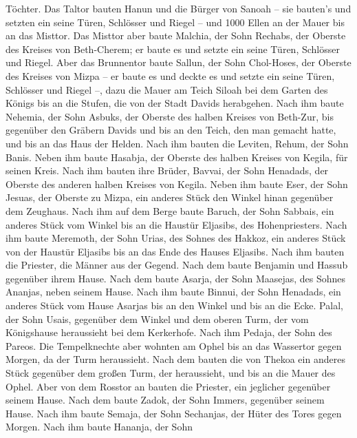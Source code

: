 Töchter.  Das Taltor bauten Hanun und die Bürger von Sanoah
-- sie bauten's und setzten ein seine Türen, Schlösser und Riegel -- und
1000 Ellen an der Mauer bis an das Misttor.  Das Misttor
aber baute Malchia, der Sohn Rechabs, der Oberste des Kreises von
Beth-Cherem; er baute es und setzte ein seine Türen, Schlösser und
Riegel.  Aber das Brunnentor baute Sallun, der Sohn
Chol-Hoses, der Oberste des Kreises von Mizpa -- er baute es und deckte
es und setzte ein seine Türen, Schlösser und Riegel --, dazu die Mauer
am Teich Siloah bei dem Garten des Königs bis an die Stufen, die von der
Stadt Davids herabgehen.  Nach ihm baute Nehemia, der Sohn
Asbuks, der Oberste des halben Kreises von Beth-Zur, bis gegenüber den
Gräbern Davids und bis an den Teich, den man gemacht hatte, und bis an
das Haus der Helden.  Nach ihm bauten die Leviten, Rehum,
der Sohn Banis. Neben ihm baute Hasabja, der Oberste des halben Kreises
von Kegila, für seinen Kreis.  Nach ihm bauten ihre Brüder,
Bavvai, der Sohn Henadads, der Oberste des anderen halben Kreises von
Kegila.  Neben ihm baute Eser, der Sohn Jesuas, der Oberste
zu Mizpa, ein anderes Stück den Winkel hinan gegenüber dem Zeughaus.
 Nach ihm auf dem Berge baute Baruch, der Sohn Sabbais, ein
anderes Stück vom Winkel bis an die Haustür Eljasibs, des
Hohenpriesters.  Nach ihm baute Meremoth, der Sohn Urias,
des Sohnes des Hakkoz, ein anderes Stück von der Haustür Eljasibs bis an
das Ende des Hauses Eljasibs.  Nach ihm bauten die
Priester, die Männer aus der Gegend.  Nach dem baute
Benjamin und Hassub gegenüber ihrem Hause. Nach dem baute Asarja, der
Sohn Maasejas, des Sohnes Ananjas, neben seinem Hause. 
Nach ihm baute Binnui, der Sohn Henadads, ein anderes Stück vom Hause
Asarjas bis an den Winkel und bis an die Ecke.  Palal, der
Sohn Usais, gegenüber dem Winkel und dem oberen Turm, der vom
Königshause heraussieht bei dem Kerkerhofe. Nach ihm Pedaja, der Sohn
des Pareos.  Die Tempelknechte aber wohnten am Ophel bis an
das Wassertor gegen Morgen, da der Turm heraussieht.  Nach
dem bauten die von Thekoa ein anderes Stück gegenüber dem großen Turm,
der heraussieht, und bis an die Mauer des Ophel.  Aber von
dem Rosstor an bauten die Priester, ein jeglicher gegenüber seinem
Hause.  Nach dem baute Zadok, der Sohn Immers, gegenüber
seinem Hause. Nach ihm baute Semaja, der Sohn Sechanjas, der Hüter des
Tores gegen Morgen.  Nach ihm baute Hananja, der Sohn
